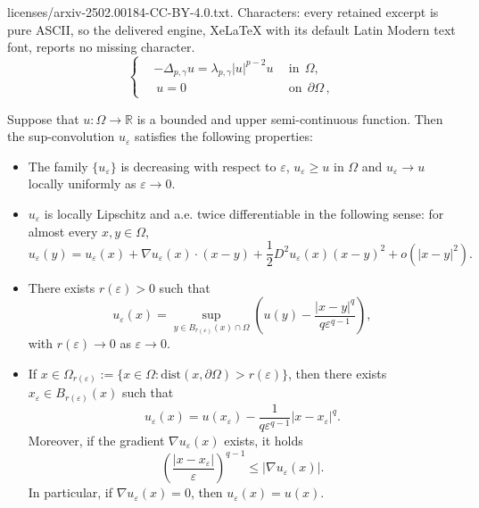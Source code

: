 \documentclass[10pt,a4paper]{amsart}
\newcommand{\R}{\mathbb R}
\begin{document}
licenses/arxiv-2502.00184-CC-BY-4.0.txt. Characters: every retained excerpt is pure ASCII, so the delivered engine, XeLaTeX with its default Latin Modern text font, reports no missing character.
\begin{equation}\label{PDE1}
\left\{
\begin{aligned}
& -\Delta_{p,\gamma} u=\lambda_{p,\gamma} |u|^{p-2}u \ \  &\mathrm {in}\ \ \Omega, \\
&\ u=0 \ \ \ \ &\mathrm {on} \ \ \partial \Omega\,,
\end{aligned}
\right.
\end{equation}

\begin{proposition}\label{inf-convo-prop}
Suppose that $u:\Omega \rightarrow \R$ is a bounded and upper semi-continuous function. Then the sup-convolution $u_\varepsilon$ satisfies the following properties:
\begin{itemize}
  \item The family $\{ u_\varepsilon\}$ is decreasing with respect to $\varepsilon$, $u_\varepsilon \geq u$ in $\Omega$ and $u_\varepsilon \rightarrow u$ locally uniformly as $\varepsilon \rightarrow  0$.

   \item $u_\varepsilon$ is locally Lipschitz and a.e. twice differentiable in the following sense: for almost every $x,y\in\Omega$,
      \[
      u_\varepsilon(y)=u_\varepsilon(x)+\nabla u_\varepsilon(x)\cdot (x-y)+\frac{1}{2}D^2 u_\varepsilon (x)(x-y)^2+o(|x-y|^2).
      \]

  \item There exists $r(\varepsilon )>0$ such that
  \[
  u_\varepsilon(x)=\mathop{\sup}_{y\in B_{r(\varepsilon)}(x)\cap \Omega} \left( u(y)-\frac{|x-y|^q}{q\varepsilon^{q-1}}\right), \]
  with $r(\varepsilon)\rightarrow 0 $ as $\varepsilon \rightarrow 0$.

  \item If $x\in \Omega_{r(\varepsilon)}:=\{ x\in \Omega: \mathrm{dist}(x,\partial \Omega)>r(\varepsilon)\}$, then there exists $x_\varepsilon\in B_{r(\varepsilon)}(x)$ such that
  \[
  u_{\varepsilon}(x)=u(x_\varepsilon)-\frac{1}{q\varepsilon^{q-1}}|x-x_\varepsilon|^q.
  \]
  Moreover, if the gradient $\nabla u_\varepsilon(x)$ exists, it holds
  \[
  \left( \frac{|x-x_\varepsilon|}{\varepsilon}\right)^{q-1} \leq |\nabla u_\varepsilon(x)|.
  \]
  In particular, if $\nabla u_\varepsilon (x)=0$, then $u_\varepsilon (x)=u(x)$.



\end{itemize}
\end{proposition}
\end{document}
